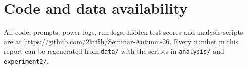 \documentclass[11pt,a4paper]{article}
\newcommand{\repourl}{\url{https://github.com/2kri5h/Seminar-Autumn-26}}
\begin{document}
\section{Code and data availability}\label{sec:code}
All code, prompts, power logs, run logs, hidden-test scores and analysis scripts are at \repourl. Every number in this report can be regenerated from \texttt{data/} with the scripts in \texttt{analysis/} and \texttt{experiment2/}.



\end{document}
